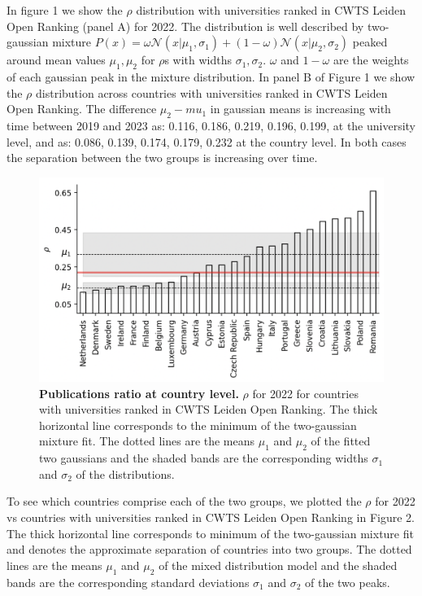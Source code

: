\documentclass[amsfonts, amssymb, prl, superscriptaddress, notitlepage, twocolumn, nofootinbib]{revtex4-2}
\begin{document}
In figure 1 we show the $\rho$ distribution with universities ranked in CWTS Leiden Open Ranking (panel A) for 2022. The distribution is well described by two-gaussian mixture $P(x) = \omega\mathcal{N}(x|\mu_1, \sigma_1) + (1-\omega)\mathcal{N}(x|\mu_2, \sigma_2)$ peaked around mean values $\mu_1, \mu_2$ for $\rho$s with widths $\sigma_1, \sigma_2$. $\omega$ and $1-\omega$ are the weights of each gaussian peak in the mixture distribution. In panel B of Figure 1 we show the $\rho$ distribution across countries with universities ranked in CWTS Leiden Open Ranking. The difference $\mu_2-mu_1$ in gaussian means is increasing with time between 2019 and 2023 as: 0.116, 0.186, 0.219, 0.196, 0.199, at the university level, and as: 0.086, 0.139, 0.174, 0.179, 0.232 at the country level. In both cases the separation between the two groups is increasing over time. 

\begin{figure}
    \centering
    \includegraphics[width=1.0\linewidth]{Fig01af.png}
    \caption{\label{fig:fig2} {\bf Publications ratio at country level.} $\rho$ for 2022 for countries with universities ranked in CWTS Leiden Open Ranking. The thick horizontal line corresponds to the minimum of the two-gaussian mixture fit. The dotted lines are the means $\mu_1$ and $\mu_2$ of the fitted two gaussians and the shaded bands are the corresponding widths $\sigma_1$ and $\sigma_2$ of the distributions.
    }
    \end{figure}

To see which countries comprise each of the two groups, we plotted the $\rho$ for 2022 vs countries with universities ranked in CWTS Leiden Open Ranking in Figure 2. The thick horizontal line corresponds to minimum of the two-gaussian mixture fit and denotes the approximate separation of countries into two groups. The dotted lines are the means $\mu_1$ and $\mu_2$ of the mixed distribution model and the shaded bands are the corresponding standard deviations $\sigma_1$ and $\sigma_2$ of the two peaks. 
\end{document}
